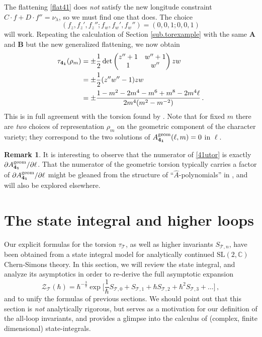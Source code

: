 \documentclass[12pt]{amsart}
\newcommand{\lbl}{\label}
\renewcommand{\eta}{\nu}
\theoremstyle{definition}
\newtheorem{remark}[theorem]{Remark}
\def\SL{\mathrm{SL}}
\def\pt{\partial}
\def\be{  \begin{equation} }
\def\ee{  \end{equation} }
\newcommand{\CZ}{\mathcal{Z}}
\newcommand{\CT}{\mathcal{T}}
\newcommand{\C}{\mathbb{C}}
\newcommand{\mb}{\mathbf}
\numberwithin{equation}{section}
\begin{document}
The flattening \eqref{flat41} does \emph{not} satisfy the new longitude constraint $C\cdot f+D\cdot f''=\eta_\lambda$, so we must find one that does. The choice
%
\be (f_z,f_z',f_z'';f_w,f_w',f_w'') =(0,0,1;0,0,1) \ee
%
will work. Repeating the calculation of Section \ref{sub.torexample} with the same $\mb A$ and $\mb B$ but the new generalized flattening, we now obtain
%
\begin{align} \tau_{\mb{4_1}}(\rho_m) &= \pm \frac12 \det\begin{pmatrix} z''+1 & w''+1\\ 1 & w'' 
\end{pmatrix} z w \notag \\
&= \pm\frac12(z''w''-1)zw \notag \\
&= \pm\frac{1-m^2-2m^4-m^6+m^8-2m^4\ell}{2m^4(m^2-m^{-2})}\,. \label{41utor}
\end{align}
%
This is in full agreement with the torsion found by \cite{GuM, DGLZ}. Note that for fixed $m$ there are \emph{two} choices of representation $\rho_m$ on the geometric component of the character variety; they correspond to the two solutions of $A_{\mb{4_1}}^{\rm geom}(\ell,m)=0$ in $\ell$.

\begin{remark}
It is interesting to observe that the numerator of \eqref{41utor} is exactly $\pt A_{\mb{4_1}}^{\rm geom}/\pt \ell$. That the numerator of the geometric torsion typically carries a factor of $\pt A_{\mb{4_1}}^{\rm geom}/\pt \ell$ might be gleaned from the structure of ``$\hat A$-polynomials'' in \cite{DGLZ, GukovS}, and will also be explored elsewhere.
\end{remark}




\section{The state integral and higher loops}
\lbl{sec.SIM}


Our explicit formulas for the torsion $\tau_\CT$, as well as higher invariants $S_{\CT,n}$, have been obtained from a state integral model for analytically continued $\SL(2,\C)$ Chern-Simons theory. In this section, we will review 
the state integral, and analyze its asymptotics in order to re-derive the full asymptotic expansion
%
\be \label{asympSIM}
\CZ_\CT(\hbar) = \hbar^{-\frac32}\exp\Big[\frac1\hbar S_{\CT,0}+S_{\CT,1}+\hbar S_{\CT,2}+\hbar^2 S_{\CT,3}+\ldots\Big]\,,
\ee
%
and to unify the formulas of previous sections. We should point out that
this section is {\em not} analytically rigorous, but serves as a motivation
for our definition of the all-loop invariants, and provides a glimpse
into the calculus of (complex, finite dimensional) state-integrals.
\end{document}
